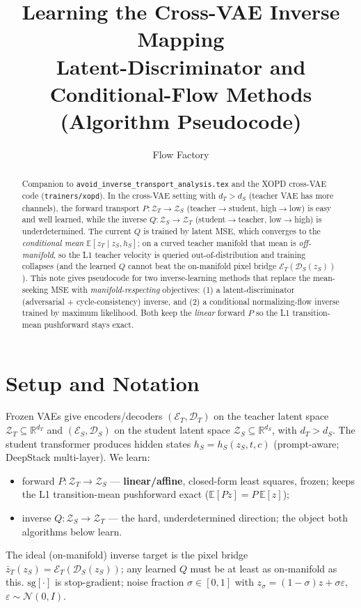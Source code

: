 \documentclass[11pt,a4paper]{article}
\title{\textbf{Learning the Cross-VAE Inverse Mapping}\\[0.3em]
\large Latent-Discriminator and Conditional-Flow Methods (Algorithm Pseudocode)}
\author{Flow Factory}
\date{}
\newcommand{\E}{\mathbb{E}}
\newcommand{\R}{\mathbb{R}}
\newcommand{\N}{\mathcal{N}}
\newcommand{\Za}{\mathcal{Z}_{T}}
\newcommand{\Zb}{\mathcal{Z}_{S}}
\newcommand{\Enc}{\mathcal{E}}
\newcommand{\Dec}{\mathcal{D}}
\newcommand{\sg}{\mathrm{sg}}
\newcommand{\zT}{z_{T}}
\newcommand{\zS}{z_{S}}
\newcommand{\hS}{h_{S}}
\begin{document}
\maketitle

\begin{abstract}
Companion to \texttt{avoid\_inverse\_transport\_analysis.tex} and the XOPD cross-VAE code
(\texttt{trainers/xopd}). In the cross-VAE setting with $d_T>d_S$ (teacher VAE has more
channels), the forward transport $P:\Za\!\to\!\Zb$ (teacher$\to$student, high$\to$low) is
easy and well learned, while the inverse $Q:\Zb\!\to\!\Za$ (student$\to$teacher, low$\to$high)
is underdetermined. The current $Q$ is trained by latent MSE, which converges to the
\emph{conditional mean} $\E[\zT\mid\zS,\hS]$; on a curved teacher manifold that mean is
\emph{off-manifold}, so the L1 teacher velocity is queried out-of-distribution and training
collapses (and the learned $Q$ cannot beat the on-manifold pixel bridge
$\Enc_T(\Dec_S(\zS))$). This note gives pseudocode for two inverse-learning methods that
replace the mean-seeking MSE with \emph{manifold-respecting} objectives: (1) a
latent-discriminator (adversarial + cycle-consistency) inverse, and (2) a conditional
normalizing-flow inverse trained by maximum likelihood. Both keep the \emph{linear} forward
$P$ so the L1 transition-mean pushforward stays exact.
\end{abstract}

\section{Setup and Notation}
\label{sec:setup}

Frozen VAEs give encoders/decoders $(\Enc_T,\Dec_T)$ on the teacher latent space
$\Za\subseteq\R^{d_T}$ and $(\Enc_S,\Dec_S)$ on the student latent space
$\Zb\subseteq\R^{d_S}$, with $d_T>d_S$. The student transformer produces hidden states
$\hS=\hS(\zS,t,c)$ (prompt-aware; DeepStack multi-layer). We learn:
\begin{itemize}[leftmargin=1.4em,itemsep=1pt]
  \item forward $P:\Za\!\to\!\Zb$ --- \textbf{linear/affine}, closed-form least squares, frozen;
        keeps the L1 transition-mean pushforward exact ($\E[Pz]=P\,\E[z]$);
  \item inverse $Q:\Zb\!\to\!\Za$ --- the hard, underdetermined direction; the object both
        algorithms below learn.
\end{itemize}
The ideal (on-manifold) inverse target is the pixel bridge
$\bar\zT(\zS)=\Enc_T(\Dec_S(\zS))$; any learned $Q$ must be at least as on-manifold as this.
$\sg[\cdot]$ is stop-gradient; noise fraction $\sigma\in[0,1]$ with
$z_\sigma=(1-\sigma)z+\sigma\varepsilon$, $\varepsilon\sim\N(0,I)$.
\end{document}
